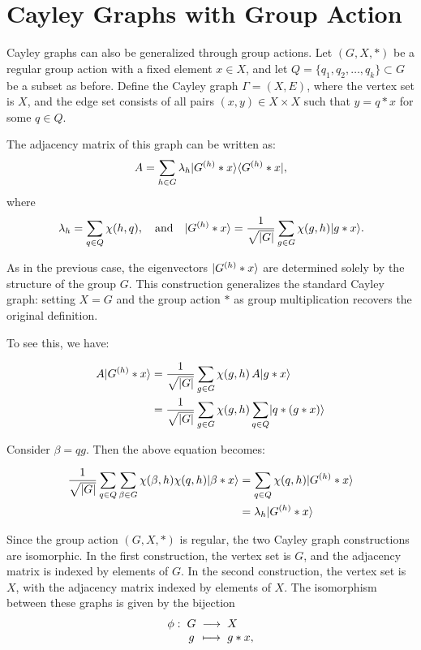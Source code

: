 \documentclass[12pt]{report}
\begin{document}
\section{Cayley Graphs with Group Action}


Cayley graphs can also be generalized through group actions. Let \( (G, X, *) \) be a regular group action with a fixed element \( x \in X \), and let \( Q = \{q_1, q_2, \dots, q_k\} \subset G \) be a subset as before. Define the Cayley graph \( \Gamma = (X, E) \), where the vertex set is \( X \), and the edge set consists of all pairs \( (x, y) \in X \times X \) such that \( y = q * x \) for some \( q \in Q \).

The adjacency matrix of this graph can be written as:
\[
A = \sum_{h \in G} \lambda_h \lvert G^{(h)} * x\rangle \langle G^{(h)} * x\rvert,
\]
where
\[
\lambda_h = \sum_{q \in Q} \chi(h, q), \quad \text{and} \quad \lvert G^{(h)} * x\rangle = \frac{1}{\sqrt{|G|}} \sum_{g \in G} \chi(g, h) \lvert g * x\rangle.
\]

As in the previous case, the eigenvectors \( \lvert G^{(h)} * x\rangle \) are determined solely by the structure of the group \( G \). This construction generalizes the standard Cayley graph: setting \( X = G \) and the group action \( * \) as group multiplication recovers the original definition.


To see this, we have:



\begin{align}
    A\lvert G^{(h)} * x\rangle 
    &= \frac{1}{\sqrt{|G|}}\sum_{g \in G} \chi(g, h)\, A\lvert g * x\rangle \nonumber \\
    &= \frac{1}{\sqrt{|G|}}\sum_{g \in G} \chi(g, h)\sum_{q \in Q} \lvert q * (g * x)\rangle \nonumber
    \end{align}
    
    \noindent Consider $\beta = qg$. Then the above equation becomes:
    
    \begin{align}
    \frac{1}{\sqrt{|G|}}\sum_{q \in Q} \sum_{\beta \in G} \chi(\beta, h)\chi(q, h)\lvert\beta * x\rangle
    &= \sum_{q \in Q} \chi(q, h)\lvert G^{(h)} * x\rangle \nonumber \\
    &= \lambda_h \lvert G^{(h)} * x\rangle \label{eq:group_action_symmetrized}
    \end{align}

    Since the group action \( (G, X, *) \) is regular, the two Cayley graph constructions are isomorphic. In the first construction, the vertex set is \( G \), and the adjacency matrix is indexed by elements of \( G \). In the second construction, the vertex set is \( X \), with the adjacency matrix indexed by elements of \( X \). The isomorphism between these graphs is given by the bijection
\[
\setlength{\arraycolsep}{1mm}
\begin{array}{rcll}
\phi: & G & \longrightarrow & X \\
      & g & \longmapsto     & g * x,
\end{array}
\]
\end{document}
